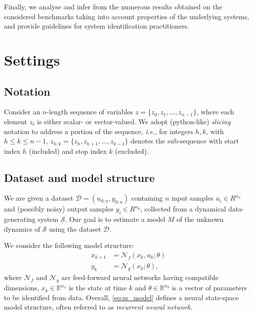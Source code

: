 \documentclass{article}
\newcommand{\NN}{\mathcal{N}} %
\newcommand{\D}{\mathcal{D}} %
\newcommand{\nsamp}{n}
\newcommand{\nin}{{n_u}}
\newcommand{\ny}{{n_y}}
\newcommand{\nx}{{n_x}}
\begin{document}
Finally, we analyse and infer from the numerous results obtained on the considered benchmarks taking into account properties of the underlying systems, and provide guidelines for system identification practitioners.


\section{Settings}
\subsection{Notation}
Consider an $\nsamp$-length sequence of variables $z=\{z_0, z_1, \dots, {z_{\nsamp-1}}\}$, where each element $z_i$ is either scalar- or vector-valued. We adopt (python-like) \emph{slicing} notation to address a portion of the sequence, \emph{i.e.}, for integers $h,k$, with $h \leq k \leq \nsamp -1$, 
$z_{h:k}=\{z_h, z_{h+1}, \dots, z_{k-1}\}$ denotes the sub-sequence with start index $h$ (included)  and stop index $k$ (excluded).


\subsection{Dataset and model structure}
We are given a dataset $\D=(u_{0:\nsamp}, y_{0:\nsamp})$ containing $\nsamp$ input samples $u_i \in R^{\nin}$ and (possibly noisy) output samples $y_i \in 
R^{\ny}$, collected from a dynamical data-generating system $\mathcal{S}$. Our goal is to estimate a  model $M$ of the unknown dynamics of $\mathcal{S}$ using the dataset $\D$.

We consider the following model structure:
 \begin{subequations}
  \label{eq:ss_model}
 \begin{align}
  x_{k+1} &= \NN_f(x_k, u_k; \theta) \label{eq:ss_model_a} \\
  y_{k} &=  \NN_g(x_k; \theta), \label{eq:ss_model_b} 
  \end{align}
\end{subequations}
where $\NN_f$ and $\NN_g$ are feed-forward neural networks having compatible dimensions, $x_k \in \mathbb{R}^{\nx}$ is the state at time $k$ and $\theta
\in \mathbb{R}^{n_\theta}$ is a vector of parameters to be identified from data. Overall, \eqref{eq:ss_model} defines a neural state-space model structure, 
often referred to as \emph{recurrent neural network}.
\end{document}
